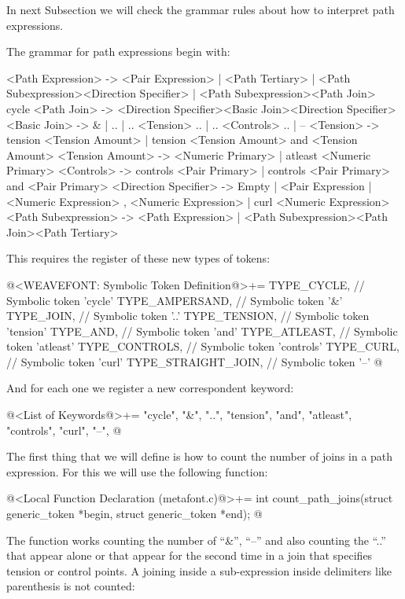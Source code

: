 In next Subsection we will check the grammar rules about how to
interpret path expressions.


The grammar for path expressions begin with:

\alinhaverbatim
<Path Expression> -> <Pair Expression> | <Path Tertiary> |
                     <Path Subexpression><Direction Specifier> |
                     <Path Subexpression><Path Join> cycle
<Path Join> -> <Direction Specifier><Basic Join><Direction Specifier>
<Basic Join> -> & | .. | .. <Tension> .. | .. <Controls> .. | --
<Tension> -> tension <Tension Amount> |
             tension <Tension Amount> and <Tension Amount>
<Tension Amount> -> <Numeric Primary> | atleast <Numeric Primary>
<Controls> -> controls <Pair Primary> |
              controls <Pair Primary> and <Pair Primary>
<Direction Specifier> -> Empty |
                         { <Pair Expression } |
                         { <Numeric Expression> , <Numeric Expression> } |
                         { curl <Numeric Expression> }
<Path Subexpression> -> <Path Expression> |
                        <Path Subexpression><Path Join><Path Tertiary>
\alinhanormal

This requires the register of these new types of tokens:

\iniciocodigo
@<WEAVEFONT: Symbolic Token Definition@>+=
TYPE_CYCLE,          // Symbolic token 'cycle'
TYPE_AMPERSAND,      // Symbolic token '&'
TYPE_JOIN,           // Symbolic token '..'
TYPE_TENSION,        // Symbolic token 'tension'
TYPE_AND,            // Symbolic token 'and'
TYPE_ATLEAST,        // Symbolic token 'atleast'
TYPE_CONTROLS,       // Symbolic token 'controls'
TYPE_CURL,           // Symbolic token 'curl'
TYPE_STRAIGHT_JOIN,  // Symbolic token '--'
@
\fimcodigo

And for each one we register a new correspondent keyword:

\iniciocodigo
@<List of Keywords@>+=
"cycle", "&", "..", "tension", "and", "atleast", "controls", "curl", "--",
@
\fimcodigo

The first thing that we will define is how to count the number of
joins in a path expression. For this we will use the following
function:

\iniciocodigo
@<Local Function Declaration (metafont.c)@>+=
int count_path_joins(struct generic_token *begin, struct generic_token *end);
@
\fimcodigo

The function works counting the number of ``\&'', ``--'' and also
counting the ``..'' that appear alone or that appear for the second
time in a join that specifies tension or control points. A joining
inside a sub-expression inside delimiters like parenthesis is not
counted:

